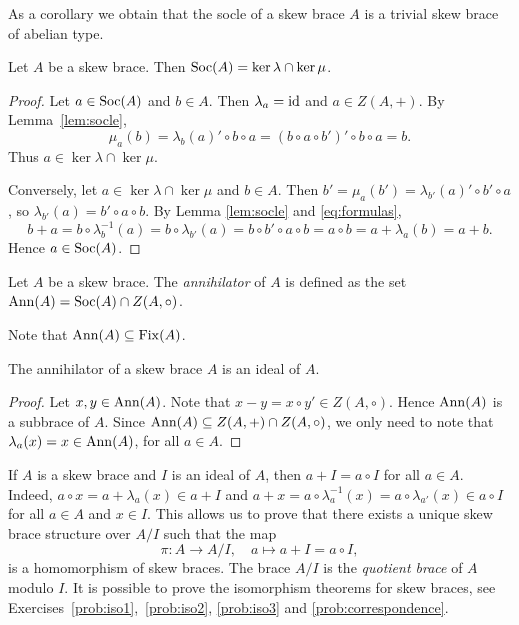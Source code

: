 As a corollary we obtain that the socle of a skew brace $A$ is a trivial skew brace of abelian type. 

\begin{proposition}
    \label{pro:soc_kernels}
    Let $A$ be a skew brace. Then $\operatorname{Soc}(A)=\ker\lambda\cap\ker\mu$.
\end{proposition}

\begin{proof}
    Let $a\in\operatorname{Soc}(A)$ and $b\in A$. Then $\lambda_a=\operatorname{id}$ and $a\in Z(A,+)$. By Lemma~\ref{lem:socle}, \[\mu_a(b)=\lambda_b(a)'\circ b\circ a=(b\circ a\circ b')'\circ b\circ a=b.\]  Thus $a\in\ker\lambda\cap\ker\mu$. 
    
    Conversely, let $a\in\ker\lambda\cap\ker\mu$ and $b\in A$. Then $b'=\mu_a(b')=\lambda_{b'}(a)'\circ b'\circ a$, so
    $\lambda_{b'}(a)=b'\circ a\circ b$. By Lemma \ref{lem:socle}
    and \eqref{eq:formulas},
    \[
    b+a=b\circ\lambda^{-1}_b(a)=b\circ\lambda_{b'}(a)=b\circ b'\circ a\circ b=a\circ b=a+\lambda_a(b)=a+b.
    \]
    Hence $a\in\operatorname{Soc}(A)$. 
\end{proof}


\begin{definition}
Let $A$ be a skew brace. The \emph{annihilator} of $A$ is 
defined as the set $\operatorname{Ann}(A)=\operatorname{Soc}(A)\cap Z(A,\circ)$. 
\end{definition}

Note that $\operatorname{Ann}(A)\subseteq\operatorname{Fix}(A)$. 

\begin{proposition}
The annihilator of a skew brace $A$ is an ideal of $A$. 
\end{proposition}

\begin{proof}
    Let $x,y\in\operatorname{Ann}(A)$. Note that $x-y=x\circ y'\in Z(A,\circ)$. Hence $\operatorname{Ann}(A)$ is a subbrace of $A$. Since $\operatorname{Ann}(A)\subseteq Z(A,+)\cap Z(A,\circ)$, 
    we only need to note that $\lambda_a(x)=x\in\operatorname{Ann}(A)$, for all $a\in A$. 
\end{proof}




If $A$ is a skew brace and $I$ is an ideal of $A$, then $a+I=a\circ I$ for all $a\in A$. Indeed, 
$a\circ x=a+\lambda_a(x)\in a+I$ and 
$a+x=a\circ\lambda_a^{-1}(x)=a\circ\lambda_{a'}(x)\in a\circ I$ 
for all $a\in A$ and $x\in I$. 
This allows us to prove that there exists a unique skew brace structure over $A/I$ such that
the map 
\[
\pi\colon A\to A/I,
\quad
a\mapsto a+I=a\circ I,
\]
is a homomorphism of skew braces. The brace $A/I$ is the \emph{quotient brace} of $A$ modulo $I$. It is possible
to prove the isomorphism theorems for skew braces, see Exercises~\ref{prob:iso1},~\ref{prob:iso2}, \ref{prob:iso3} and
\ref{prob:correspondence}.

